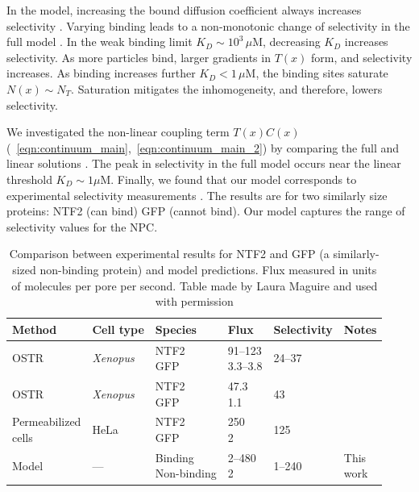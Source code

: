 In the model, increasing the bound diffusion coefficient always increases
selectivity .  Varying binding leads to a non-monotonic
change of selectivity in the full model .  In the weak
binding limit $K_D \sim 10^3 \, \mu$M, decreasing $K_D$ increases selectivity.
As more particles bind, larger gradients in $T(x)$ form, and selectivity
increases.  As binding increases further $K_D < 1 \, \mu$M, the binding sites
saturate $N(x) \sim N_T$.  Saturation mitigates the inhomogeneity, and
therefore, lowers selectivity.

We investigated the non-linear coupling term $T(x)C(x)$
(\eqn~\ref{eqn:continuum_main},~\ref{eqn:continuum_main_2}) by comparing the
full  and linear solutions .
The peak in selectivity in the full model occurs near the linear threshold $K_D
\sim 1\mu$M. Finally, we found that our model corresponds to experimental
selectivity measurements . The results are for two
similarly size proteins: NTF2 (can bind) GFP (cannot bind). Our model captures
the range of selectivity values for the NPC\@.
\begin{table}[!b]
  \begin{center}
    \begin{tabular}{p{2.7cm}p{1.75cm}p{2.75cm}p{1.75cm}p{1.75cm}p{1.75cm}}
      Method & Cell type & Species & Flux & Selectivity & Notes\\
      \toprule
      OSTR & \textit{Xenopus} & \makecell[cl]{NTF2\\GFP} & 
      \makecell[cl]{91--123\\3.3--3.8} & 24--37 &\cite{siebrasse_rapid_02} \\
      OSTR & \textit{Xenopus} & \makecell[cl]{NTF2\\GFP} &
      \makecell[cl]{47.3\\1.1} & 43 &~\cite{kiskin_optical_03}\\
      \makecell[cl]{Permeabilized \\ cells}  & HeLa &
      \makecell[cl]{NTF2\\GFP} &
      \makecell[cl]{250\\2} & 125 &~\cite{ribbeck_kinetic_01}\\
      Model & --- & \makecell[cl]{Binding\\Non-binding} & 
      \makecell[cl]{2--480\\2} & 1--240 & \makecell[cl]{This\\work}\\
    \end{tabular}
  \end{center}
  \caption[Selectivity comparison between experiment and model]
  {Comparison between experimental results for NTF2 and GFP
    (a similarly-sized non-binding protein) and model
    predictions. Flux measured in units of molecules per pore per
    second. Table made by Laura Maguire and 
    used with permission}\label{table:NTF2-flux}
\end{table}

